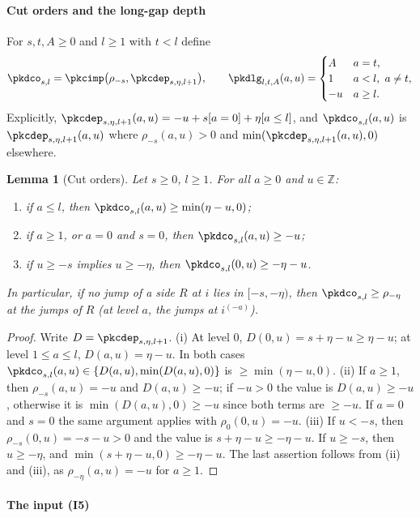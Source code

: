 \documentclass[10pt]{amsart}
\newtheorem{lemma}[theorem]{Lemma}
\theoremstyle{definition}
\theoremstyle{remark}
\newcommand{\Z}{\mathbb Z}
\begin{document}
\paragraph*{Cut orders and the long-gap depth}

For $s,t,A\ge0$ and $l\ge1$ with $t<l$ define
\[
\pkdco_{s,l}=\pkcimp\bigl(\rho_{-s},\pkcdep_{s,\eta,l+1}\bigr),\qquad
\pkdlg_{l,t,A}(a,u)=\begin{cases}A&a=t,\\ 1&a<l,\ a\ne t,\\ -u&a\ge l.\end{cases}
\]
Explicitly, $\pkcdep_{s,\eta,l+1}(a,u)=-u+s[a=0]+\eta[a\le l]$, and $\pkdco_{s,l}(a,u)$ is
$\pkcdep_{s,\eta,l+1}(a,u)$ where $\rho_{-s}(a,u)>0$ and $\min(\pkcdep_{s,\eta,l+1}(a,u),0)$ elsewhere.

\begin{lemma}[Cut orders]\label{pkd:co}
Let $s\ge0$, $l\ge1$. For all $a\ge0$ and $u\in\Z$:
\begin{enumerate}
\item[(i)] if $a\le l$, then $\pkdco_{s,l}(a,u)\ge\min(\eta-u,0)$;
\item[(ii)] if $a\ge1$, or $a=0$ and $s=0$, then $\pkdco_{s,l}(a,u)\ge-u$;
\item[(iii)] if $u\ge-s$ implies $u\ge-\eta$, then $\pkdco_{s,l}(0,u)\ge-\eta-u$.
\end{enumerate}
In particular, if no jump of a side $R$ at $i$ lies in $[-s,-\eta)$, then $\pkdco_{s,l}\ge\rho_{-\eta}$
at the jumps of $R$ (at level $a$, the jumps at $i^{(-a)}$).
\end{lemma}

\begin{proof}
Write $D=\pkcdep_{s,\eta,l+1}$. (i) At level $0$, $D(0,u)=s+\eta-u\ge\eta-u$; at level $1\le a\le l$,
$D(a,u)=\eta-u$. In both cases $\pkdco_{s,l}(a,u)\in\{D(a,u),\min(D(a,u),0)\}$ is
$\ge\min(\eta-u,0)$. (ii) If $a\ge1$, then $\rho_{-s}(a,u)=-u$ and $D(a,u)\ge-u$; if $-u>0$ the value is
$D(a,u)\ge-u$, otherwise it is $\min(D(a,u),0)\ge-u$ since both terms are $\ge-u$. If $a=0$ and
$s=0$ the same argument applies with $\rho_0(0,u)=-u$. (iii) If $u<-s$, then $\rho_{-s}(0,u)=-s-u>0$
and the value is $s+\eta-u\ge-\eta-u$. If $u\ge-s$, then $u\ge-\eta$, and $\min(s+\eta-u,0)\ge-\eta-u$.
The last assertion follows from (ii) and (iii), as $\rho_{-\eta}(a,u)=-u$ for $a\ge1$.
\end{proof}

\paragraph*{The input (I5)}
\end{document}
